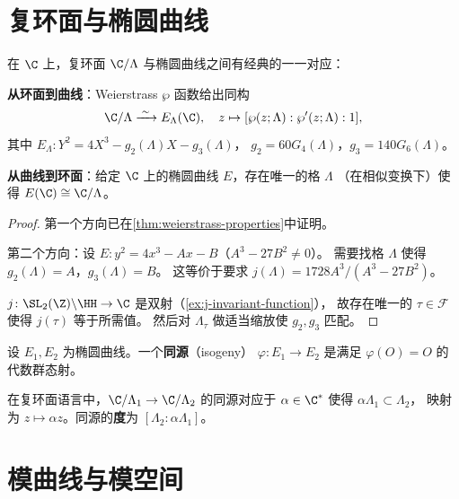 \section{复环面与椭圆曲线}
\label{sec:tori-and-ec}

\begin{theorem}[均匀化定理]
\label{thm:uniformization}
在 $\C$ 上，复环面 $\C/\Lambda$ 与椭圆曲线之间有经典的一一对应：

\textbf{从环面到曲线}：Weierstrass $\wp$ 函数给出同构
\[
  \C/\Lambda \xrightarrow{\;\sim\;} E_\Lambda(\C), \quad
  z \mapsto [\wp(z;\Lambda) : \wp'(z;\Lambda) : 1],
\]
其中 $E_\Lambda\colon Y^2 = 4X^3 - g_2(\Lambda)X - g_3(\Lambda)$，
$g_2 = 60G_4(\Lambda)$，$g_3 = 140G_6(\Lambda)$。

\textbf{从曲线到环面}：给定 $\C$ 上的椭圆曲线 $E$，存在唯一的格 $\Lambda$
（在相似变换下）使得 $E(\C) \cong \C/\Lambda$。
\end{theorem}

\begin{proof}
第一个方向已在\cref{thm:weierstrass-properties}中证明。

第二个方向：设 $E\colon y^2 = 4x^3 - Ax - B$（$A^3 - 27B^2 \neq 0$）。
需要找格 $\Lambda$ 使得 $g_2(\Lambda) = A$，$g_3(\Lambda) = B$。
这等价于要求 $j(\Lambda) = 1728 A^3/(A^3 - 27B^2)$。

$j\colon \SL_2(\Z) \backslash \HH \to \C$ 是双射（\cref{ex:j-invariant-function}），
故存在唯一的 $\tau \in \mathcal{F}$ 使得 $j(\tau)$ 等于所需值。
然后对 $\Lambda_\tau$ 做适当缩放使 $g_2, g_3$ 匹配。
\end{proof}

\begin{definition}[同源]
\label{def:isogeny}
设 $E_1, E_2$ 为椭圆曲线。一个\textbf{同源}（isogeny）
$\varphi\colon E_1 \to E_2$ 是满足 $\varphi(O) = O$ 的代数群态射。

在复环面语言中，$\C/\Lambda_1 \to \C/\Lambda_2$ 的同源对应于
$\alpha \in \C^*$ 使得 $\alpha\Lambda_1 \subset \Lambda_2$，
映射为 $z \mapsto \alpha z$。同源的\textbf{度}为 $[\Lambda_2 : \alpha\Lambda_1]$。
\end{definition}


\section{模曲线与模空间}
\label{sec:modular-curves-moduli}

